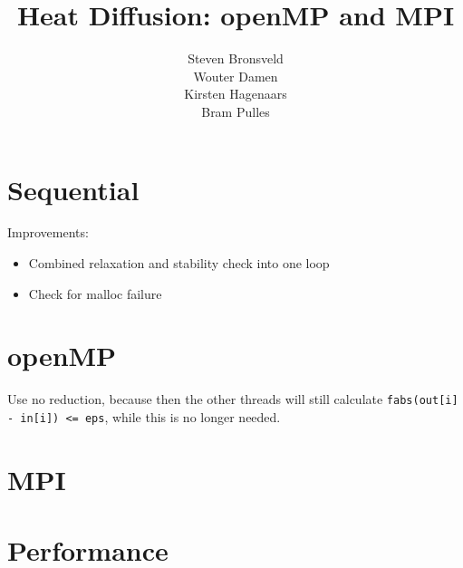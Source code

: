 \documentclass[a4paper]{article}
\author{Steven Bronsveld\\Wouter Damen\\Kirsten Hagenaars\\Bram Pulles}
\title{\textbf{Heat Diffusion: openMP and MPI}}
\begin{document}
\maketitle

\tableofcontents

\pagebreak
\section{Sequential}
Improvements:
\begin{itemize}
    \item Combined relaxation and stability check into one loop
    \item Check for malloc failure
\end{itemize}
\section{openMP}
Use no reduction, because then the other threads will still calculate \texttt{fabs(out[i] - in[i]) <= eps}, while this is no longer needed.

\section{MPI}

\section{Performance}
\end{document}
